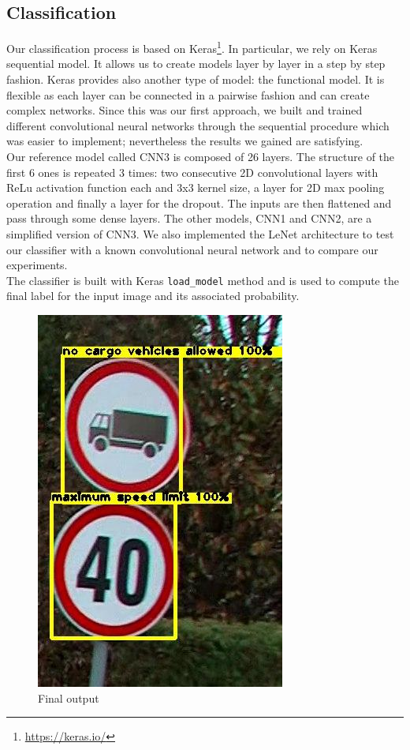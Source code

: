 \documentclass[10pt,twocolumn,letterpaper]{article}
\begin{document}
\subsection{Classification}
Our classification process is based on Keras\footnote{\url{https://keras.io/}}. In particular, we rely on Keras sequential model. It allows us to create models layer by layer in a step by step fashion. Keras provides also another type of model: the functional model. It is flexible as each layer can be connected in a pairwise fashion and can create complex networks. Since this was our first approach, we built and trained different convolutional neural networks through the sequential procedure which was easier to implement; nevertheless the results we gained are satisfying.\\
Our reference model called CNN3 is composed of 26 layers. The structure of the first 6 ones is repeated 3 times: two consecutive 2D convolutional layers with ReLu activation function each and $3$x$3$ kernel size, a layer for 2D max pooling operation and finally a layer for the dropout. The inputs are then flattened and pass through some dense layers. The other models, CNN1 and CNN2, are a simplified version of CNN3. We also implemented the LeNet architecture to test our classifier with a known convolutional neural network and to compare our experiments.\\
The classifier is built with Keras \texttt{load\_model} method and is used to compute the final label for the input image and its associated probability.
\begin{figure}[h]
	\centering\includegraphics[scale=0.5]{Res/Immagini/classExample.jpg}	
	\caption{Final output}
\end{figure}
\end{document}
